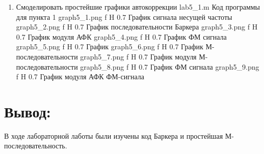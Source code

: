 \documentclass{bmstu}
\begin{document}
\begin{enumerate}

\item Смоделировать простейшие графики автокоррекции
        {lab5_1.m}
        {Код программы для пункта 1}
        {graph5_1.png}
        {f}
        {H}
        {0.7\textwidth}
        {График сигнала несущей частоты}
        {graph5_2.png}
        {f}
        {H}
        {0.7\textwidth}
        {График последовательности Баркера}
        {graph5_3.png}
        {f}
        {H}
        {0.7\textwidth}
        {График модуля АФК}
        {graph5_4.png}
        {f}
        {H}
        {0.7\textwidth}
        {График ФМ сигнала}
        {graph5_5.png}
        {f}
        {H}
        {0.7\textwidth}
        {График }
        {graph5_6.png}
        {f}
        {H}
        {0.7\textwidth}
        {График М-последовательности}
        {graph5_7.png}
        {f}
        {H}
        {0.7\textwidth}
        {График модуля М-последовательности}
        {graph5_8.png}
        {f}
        {H}
        {0.7\textwidth}
        {График ФМ сигнала}
        {graph5_9.png}
        {f}
        {H}
        {0.7\textwidth}
        {График модуля АФК ФМ-сигнала}


\end{enumerate}

\chapter{Вывод:}
В ходе лабораторной лаботы были изучены код Баркера и простейшая М-последовательность. 
\end{document}
